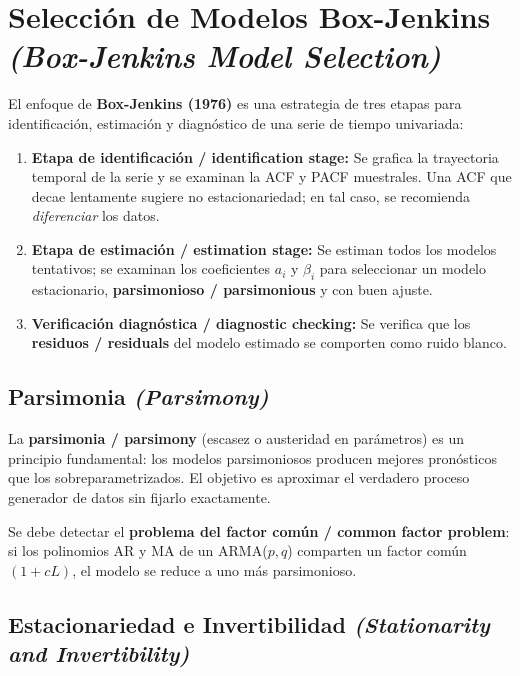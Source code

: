 \documentclass[12pt]{article}
\begin{document}
\section{Selecci\'on de Modelos Box-Jenkins \textit{(Box-Jenkins Model Selection)}}

El enfoque de \textbf{Box-Jenkins (1976)} es una estrategia de tres etapas para identificaci\'on, estimaci\'on y diagn\'ostico de una serie de tiempo univariada:

\begin{enumerate}
  \item \textbf{Etapa de identificaci\'on / identification stage:} Se grafica la trayectoria temporal de la serie y se examinan la ACF y PACF muestrales. Una ACF que decae lentamente sugiere no estacionariedad; en tal caso, se recomienda \textit{diferenciar} los datos.
  \item \textbf{Etapa de estimaci\'on / estimation stage:} Se estiman todos los modelos tentativos; se examinan los coeficientes $a_i$ y $\beta_i$ para seleccionar un modelo estacionario, \textbf{parsimonioso / parsimonious} y con buen ajuste.
  \item \textbf{Verificaci\'on diagn\'ostica / diagnostic checking:} Se verifica que los \textbf{residuos / residuals} del modelo estimado se comporten como ruido blanco.
\end{enumerate}

\subsection{Parsimonia \textit{(Parsimony)}}

La \textbf{parsimonia / parsimony} (escasez o austeridad en par\'ametros) es un principio fundamental: los modelos parsimoniosos producen mejores pron\'osticos que los sobreparametrizados. El objetivo es aproximar el verdadero proceso generador de datos sin fijarlo exactamente.

Se debe detectar el \textbf{problema del factor com\'un / common factor problem}: si los polinomios AR y MA de un ARMA($p,q$) comparten un factor com\'un $(1+cL)$, el modelo se reduce a uno m\'as parsimonioso.

\subsection{Estacionariedad e Invertibilidad \textit{(Stationarity and Invertibility)}}
\end{document}
